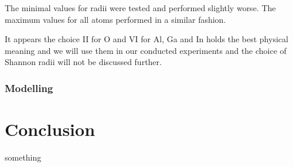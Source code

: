 \documentclass[11pt,oneside,czech,american]{book} %
\theoremstyle{plain}
\theoremstyle{definition}
\begin{document}
The minimal values for radii were tested and performed slightly worse. The maximum values for all atoms performed in a similar fashion. 

It appears the choice II for O and VI for Al, Ga and In holds the best physical meaning and we will use them in our conducted experiments and the choice of Shannon radii will not be discussed further.


\subsection{Modelling}

\chapter*{Conclusion}
\pagestyle{plain}


something

\appendix
\end{document}
